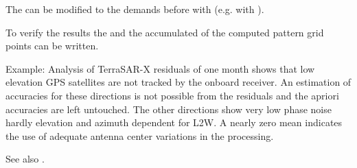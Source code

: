 The  can be modified
to the demands before with 
(e.g. with ).

To verify the results the 
and the accumulated 
of the computed pattern grid points can be written.

Example: Analysis of TerraSAR-X residuals of one month shows that low elevation
GPS satellites are not tracked by the onboard receiver. An estimation of accuracies
for these directions is not possible from the residuals and the apriori accuracies
are left untouched. The other directions show very low phase noise hardly elevation
and azimuth dependent for L2W. A nearly zero mean indicates the use of adequate antenna
center variations in the processing.


See also .


